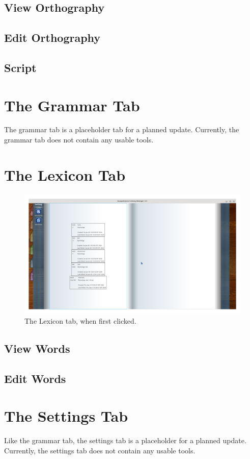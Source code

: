 \documentclass{report}
\begin{document}
	\section{View Orthography}
	\section{Edit Orthography}
	\section{Script}
	
	\chapter{The Grammar Tab}
	The grammar tab is a placeholder tab for a planned update. Currently, the grammar tab
	does not contain any usable tools.
	
	\chapter{The Lexicon Tab}
	\begin{figure}[ht]
		\centering
		\includegraphics[width=1\linewidth]{img/lexicon-tab}
		\caption{The Lexicon tab, when first clicked.}
		\label{fig:lexicon-tab}
	\end{figure}
	\section{View Words}
	\section{Edit Words}
	
	\chapter{The Settings Tab}
	Like the grammar tab, the settings tab is a placeholder for a planned update. Currently,
	the settings tab does not contain any usable tools.
	
\end{document}
